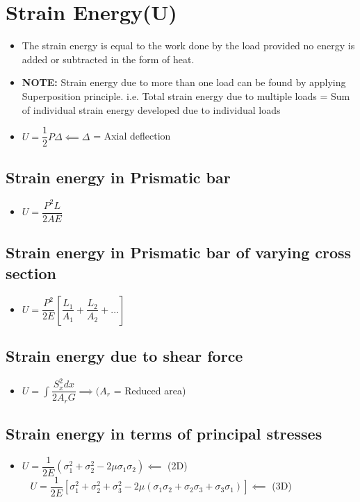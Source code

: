\documentclass[8pt]{report}
\begin{document}
	\section{Strain Energy(U)}
		\begin{itemize}
			\item The strain energy is equal to the work done by the load provided no energy is added or subtracted in the form of heat.
			\item \textbf{NOTE: } Strain energy due to more than one load can be found by applying Superposition principle. i.e. Total strain energy due to multiple loads = Sum of individual strain energy developed due to individual loads
			\item $\boxed{U = \dfrac{1}{2}P\Delta} \impliedby \Delta$ = Axial deflection 
		\end{itemize}\hrulefill
		\subsection{Strain energy in Prismatic bar}
			\begin{itemize}
				\item $\boxed{U = \dfrac{P^2L}{2AE}}$
			\end{itemize}\hrulefill
		\subsection{Strain energy in Prismatic bar of varying cross section}
			\begin{itemize}
				\item $\boxed{U = \dfrac{P^2}{2E}\left[\dfrac{L_1}{A_1}+\dfrac{L_2}{A_2}+...\right]}$
			\end{itemize}\hrulefill
		\subsection{Strain energy due to shear force}
			\begin{itemize}
				\item $\boxed{U = \int\dfrac{S_x^2dx}{2A_rG}}\implies (A_r$ = Reduced area)
			\end{itemize}\hrulefill
		\subsection{Strain energy in terms of principal stresses}
			\begin{itemize}
				\item $\boxed{U = \dfrac{1}{2E}(\sigma_1^2+\sigma_2^2-2\mu\sigma_1\sigma_2)} \impliedby$ (2D) $\;\;\;\boxed{U = \dfrac{1}{2E}\left[\sigma_1^2+\sigma_2^2+\sigma_3^2-2\mu(\sigma_1\sigma_2+\sigma_2\sigma_3+\sigma_3\sigma_1)\right]} \impliedby$ (3D)
			\end{itemize}\hrulefill
\end{document}
